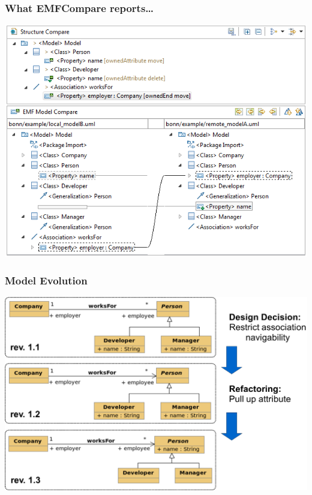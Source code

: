 \begin{frame}
  \frametitle{What EMFCompare reports\ldots}
  \begin{center}
  \includegraphics[scale=0.55]{images/emf_compare}
  \end{center}
\end{frame}
\begin{frame}[t]
  \frametitle{Model Evolution}
  \begin{flushleft}
  \includegraphics[scale=0.2]{images/uml_example_05_01}
  \end{flushleft}
\end{frame}

